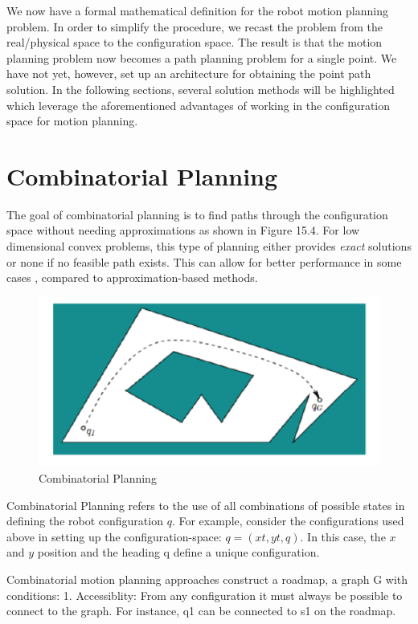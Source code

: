 \documentclass[twoside]{article}
\begin{document}
We now have a formal mathematical definition for the robot motion planning problem. In order to simplify the procedure, we recast the problem from the real/physical space to the configuration space. The result is that the motion planning problem now becomes a path planning problem for a single point. We have not yet, however, set up an architecture for obtaining the point path solution. In the following sections, several solution methods will be highlighted which leverage the aforementioned advantages of working in the configuration space for motion planning.

\section{Combinatorial Planning}
The goal of combinatorial planning is to find paths through the configuration space without needing approximations as shown in Figure 15.4. For low dimensional convex problems, this type of planning either provides \textit{exact} solutions or none if no feasible path exists. This can allow for better performance in some cases , compared to approximation-based methods.

\begin{figure}[H]
\begin{center}
\includegraphics{fig15_4.PNG}
\caption{Combinatorial Planning}
\end{center}
\end{figure}

Combinatorial Planning refers to the use of all combinations of possible states in defining the robot configuration $q$. For example, consider the configurations used above in setting up the configuration-space: $q = (xt, yt, q)$. In this case, the $x$ and $y$ position and the heading q define a unique configuration.

Combinatorial motion planning approaches construct a roadmap, a graph G with conditions:
1. Accessiblity: From any configuration it must always be possible to connect to the graph. For instance, q1 can be connected to s1 on the roadmap.
\end{document}
